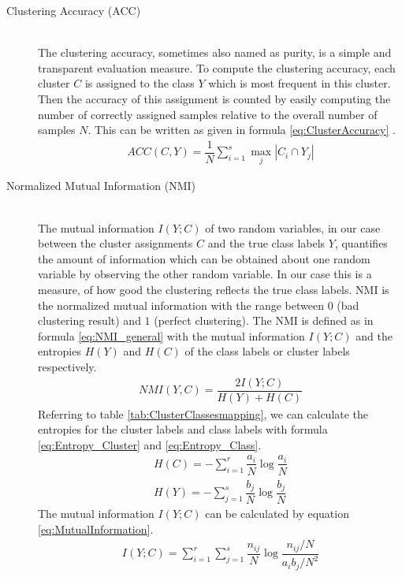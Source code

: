 \documentclass[12pt,DIV14,BCOR12mm,a4paper,footexclude,headinclude,halfparskip-,twoside,openright,cleardoubleempty,idxtotoc,bibtotoc,listtotoc]{scrreprt} %
\numberwithin{equation}{chapter}
\begin{document}
\begin{description}
	\item[Clustering Accuracy (ACC)]\hfill \\
	The clustering accuracy, sometimes also named as purity, is a simple and transparent evaluation measure. To compute the clustering accuracy, each cluster $C$ is assigned to the class $Y$ which is most frequent in this cluster. Then the accuracy of this assignment is counted by easily computing the number of correctly assigned samples relative to the overall number of samples $N$. This can be written as given in formula \ref{eq:ClusterAccuracy} \cite{Manning08InformationRetrieval}.
	\begin{align}
		ACC(C,Y) = \dfrac{1}{N}\sum_{i=1}^s\underset{j}\max|C_i\cap Y_j|\label{eq:ClusterAccuracy}
	\end{align}
	\item[Normalized Mutual Information (NMI)]\hfill \\
	The mutual information $I(Y;C)$ of two random variables, in our case between the cluster assignments $C$ and the true class labels $Y$, quantifies the amount of information which can be obtained about one random variable by observing the other random variable. In our case this is a measure, of how good the clustering reflects the true class labels. NMI is the normalized mutual information with the range between $0$ (bad clustering result) and $1$ (perfect clustering). The NMI is defined as in formula \ref{eq:NMI_general} with the mutual information $I(Y;C)$ and the entropies $H(Y)$ and $H(C)$ of the class labels or cluster labels respectively.
	\begin{align}
		NMI(Y,C) = \dfrac{2I(Y;C)}{H(Y)+H(C)}\label{eq:NMI_general}
	\end{align}
	Referring to table \ref{tab:ClusterClassesmapping}, we can calculate the entropies for the cluster labels and class labels with formula \ref{eq:Entropy_Cluster} and \ref{eq:Entropy_Class}.
	\begin{align}
		H(C) = -\sum_{i=1}^r\dfrac{a_i}{N}\log\dfrac{a_i}{N}\label{eq:Entropy_Cluster}\\
		H(Y) = -\sum_{j=1}^s\dfrac{b_j}{N}\log\dfrac{b_j}{N}\label{eq:Entropy_Class}
	\end{align}
	The mutual information $I(Y;C)$ can be calculated by equation \ref{eq:MutualInformation}.
	\begin{align}
		I(Y;C) = \sum_{i=1}^r\sum_{j=1}^s\dfrac{n_{ij}}{N}\log\dfrac{n_{ij}/N}{a_ib_j/N^2}\label{eq:MutualInformation}
	\end{align}

\end{description}
\end{document}
